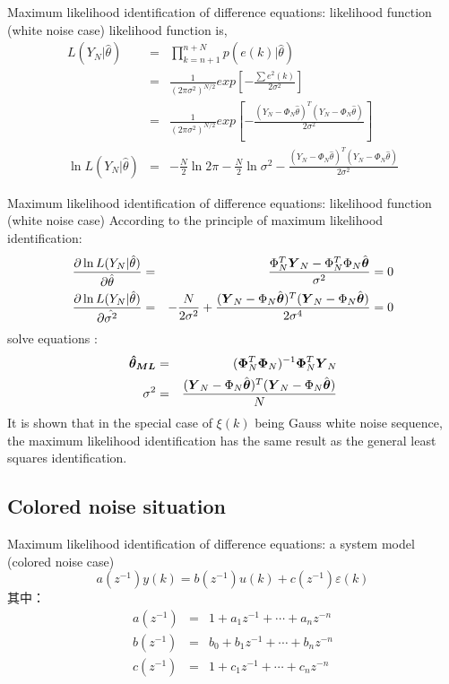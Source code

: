 \begin{frame}{ Maximum likelihood identification of difference equations: likelihood function (white noise case) }
likelihood function is,
\begin{eqnarray*}
L(Y_N|\hat\theta)&=&\prod_{k=n+1}^{n+N}p(e(k)|\hat\theta) \\
&=&\frac{1}{(2\pi\sigma^2)^{N/2}}exp[-\frac{\sum e^2(k)}{2\sigma^2}] \\
&=&\frac{1}{(2\pi\sigma^2)^{N/2}}exp[-\frac{(Y_N-\Phi_N\hat\theta)^T(Y_N-\Phi_N\hat\theta)}{2\sigma^2}] \\
\ln L(Y_N|\hat\theta)&=& -\frac{N}{2}\ln 2\pi-\frac{N}{2}\ln\sigma^2-\frac{(Y_N-\Phi_N\hat\theta)^T(Y_N-\Phi_N\hat\theta)}{2\sigma^2}
\end{eqnarray*}
\end{frame}

\begin{frame}{ Maximum likelihood identification of difference equations: likelihood function (white noise case) }
According to the principle of maximum likelihood identification: 
\begin{eqnarray*}
\frac{\partial\ln L(Y_N|\hat{\theta})}{\partial\hat{\theta}} &=& \frac{\Phi^T_N\boldsymbol{Y}_N-\Phi^T_N\Phi_N\hat{\boldsymbol{\theta}}}{\sigma^2}=0  \\
\frac{\partial\ln L(Y_N|\hat{\theta})}{\partial\hat{\sigma^2}} &=&-\frac{N}{2\sigma^2}+\frac{(\boldsymbol{Y}_N-\Phi_N\hat{\boldsymbol{\theta}})^T(\boldsymbol{Y}_N-\Phi_N\hat{\boldsymbol{\theta}})}{2\sigma^4}=0
\end{eqnarray*}
 solve equations : 
\begin{eqnarray*}
\boldsymbol{\hat\theta_{ML}} &=& (\boldsymbol{\Phi}^T_N\boldsymbol{\Phi}_N)^{-1}\boldsymbol{\Phi}^T_N\boldsymbol{Y}_N   \\
\sigma^2 &=& \frac{(\boldsymbol{Y}_N-\Phi_N\hat{\boldsymbol{\theta}})^T(\boldsymbol{Y}_N-\Phi_N\hat{\boldsymbol{\theta}})}{N}
\end{eqnarray*}
It is shown that in the special case of $\xi(k)$ being Gauss white noise sequence, the maximum likelihood identification has the same result as the general least squares identification. 
\end{frame}

\subsection{ Colored noise situation }

\begin{frame}{ Maximum likelihood identification of difference equations: a system model (colored noise case) }
$$a(z^{-1})y(k) = b (z^{-1})u(k)+c(z^{-1})\varepsilon(k)$$
其中：
\begin{eqnarray*}
a(z^{-1}) &=&  1+a_1z^{-1}+ \cdots +a_n z^{-n} \\
b(z^{-1}) &=&  b_0+b_1z^{-1}+ \cdots +b_n z^{-n} \\
c(z^{-1}) &=&  1+c_1z^{-1}+ \cdots +c_n z^{-n} 
\end{eqnarray*}
\end{frame}

